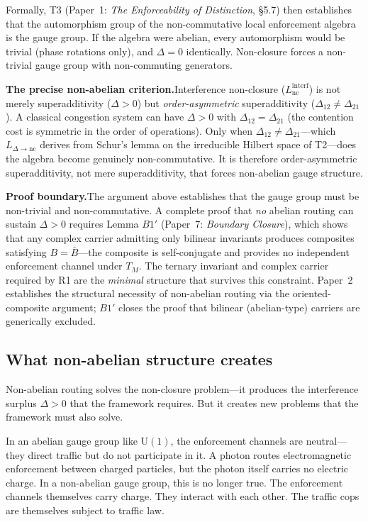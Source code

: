 \documentclass[11pt]{article}
\newcommand{\U}{\mathrm{U}}
\begin{document}
Formally, T3 (Paper~1: \emph{The Enforceability of Distinction}, \S5.7) then establishes that the automorphism group of the non-commutative local enforcement algebra is the gauge group.  If the algebra were abelian, every automorphism would be trivial (phase rotations only), and $\Delta = 0$ identically.  Non-closure forces a non-trivial gauge group with non-commuting generators.

\smallskip
\noindent\textbf{The precise non-abelian criterion.}\quad Interference non-closure ($L_{\mathrm{nc}}^{\mathrm{interf}}$) is not merely superadditivity ($\Delta > 0$) but \emph{order-asymmetric} superadditivity ($\Delta_{12} \ne \Delta_{21}$).  A classical congestion system can have $\Delta > 0$ with $\Delta_{12} = \Delta_{21}$ (the contention cost is symmetric in the order of operations).  Only when $\Delta_{12} \ne \Delta_{21}$---which $L_{\Delta\to\mathrm{nc}}$ derives from Schur's lemma on the irreducible Hilbert space of T2---does the algebra become genuinely non-commutative.  It is therefore order-asymmetric superadditivity, not mere superadditivity, that forces non-abelian gauge structure.

\smallskip
\noindent\textbf{Proof boundary.}\quad The argument above establishes that the gauge group must be non-trivial and non-commutative.  A complete proof that \emph{no} abelian routing can sustain $\Delta > 0$ requires Lemma $B1'$ (Paper~7: \emph{Boundary Closure}), which shows that any complex carrier admitting only bilinear invariants produces composites satisfying $B = \bar{B}$---the composite is self-conjugate and provides no independent enforcement channel under $T_M$.  The ternary invariant and complex carrier required by R1 are the \emph{minimal} structure that survives this constraint.  Paper~2 establishes the structural necessity of non-abelian routing via the oriented-composite argument; $B1'$ closes the proof that bilinear (abelian-type) carriers are generically excluded.


\subsection{What non-abelian structure creates}

Non-abelian routing solves the non-closure problem---it produces the interference surplus $\Delta > 0$ that the framework requires.  But it creates new problems that the framework must also solve.

In an abelian gauge group like $\U(1)$, the enforcement channels are neutral---they direct traffic but do not participate in it.  A photon routes electromagnetic enforcement between charged particles, but the photon itself carries no electric charge.  In a non-abelian gauge group, this is no longer true.  The enforcement channels themselves carry charge.  They interact with each other.  The traffic cops are themselves subject to traffic law.
\end{document}
